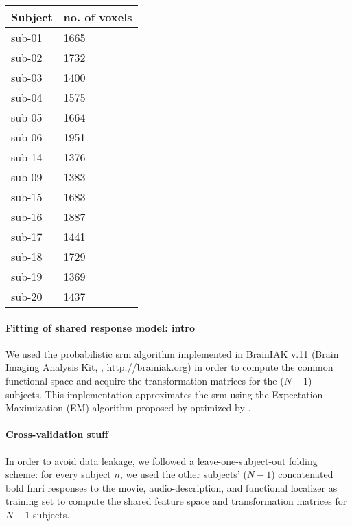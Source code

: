 \begin{table*}[btp]
    \caption{Number of remaining voxels after time series data of each paradigm
    and subject were masked with the union of individual \acp{ppa} that was
    warped from MNI space into each individual's subjects-space and the
    subject-specific field of view of audio-description.}

\label{tab:ppamaskvoxels}
\begin{tabular}{ll}
\toprule
\textbf{Subject} & \textbf{no. of voxels} \\
\midrule
sub-01 & 1665 \tabularnewline
sub-02 & 1732 \tabularnewline
sub-03 & 1400 \tabularnewline
sub-04 & 1575 \tabularnewline
sub-05 & 1664 \tabularnewline
sub-06 & 1951 \tabularnewline
sub-14 & 1376 \tabularnewline
sub-09 & 1383 \tabularnewline
sub-15 & 1683 \tabularnewline
sub-16 & 1887 \tabularnewline
sub-17 & 1441 \tabularnewline
sub-18 & 1729 \tabularnewline
sub-19 & 1369 \tabularnewline
sub-20 & 1437 \tabularnewline
\bottomrule
\end{tabular}
\end{table*}


\paragraph{Fitting of shared response model: intro}


We used the probabilistic \ac{srm} algorithm implemented in BrainIAK v.11 (Brain
Imaging Analysis Kit, \citet{kumar2020brainiak, kumar2020brainiaktutorial},
http://brainiak.org) in order to compute the common functional space and acquire
the transformation matrices for the ($N-1$) subjects.
%
This implementation approximates the \ac{srm} using the Expectation Maximization
(EM) algorithm proposed by \citep{chen2015reduced} optimized by
\citet{anderson2016enabling}.


\paragraph{Cross-validation stuff}


%
In order to avoid data leakage, we followed a leave-one-subject-out folding
scheme:
%
for every subject $n$, we used the other subjects' ($N-1$) concatenated
\ac{bold} \ac{fmri} responses to the movie, audio-description, and functional
localizer as training set to compute the shared feature space and transformation
matrices for $N-1$ subjects.



